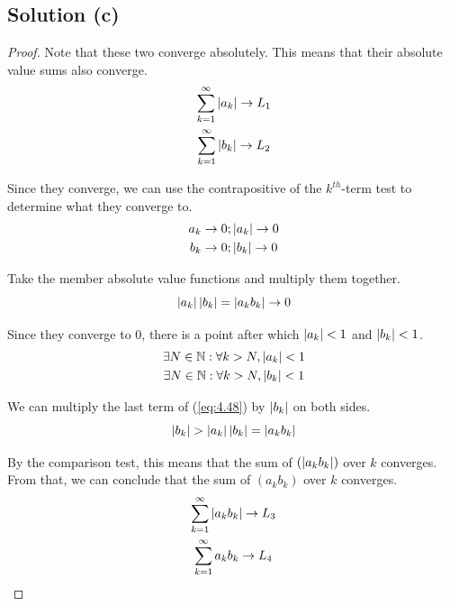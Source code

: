 \documentclass[12pt]{report}
\begin{document}
    \subsection{Solution (c)}
        \begin{proof}
            Note that these two converge absolutely.
            This means that their absolute value sums also converge.
            \begin{gather}
                \sum_{k = 1}^{\infty} \left| a_k \right| \to L_1\\
                \sum_{k = 1}^{\infty} \left| b_k \right| \to L_2
            \end{gather}

            Since they converge, we can use the contrapositive of the $k^{th}$-term test to determine what they converge to.
            \begin{gather}
                a_k \to 0; \left| a_k \right| \to 0\\
                b_k \to 0; \left| b_k \right| \to 0
            \end{gather}

            Take the member absolute value functions and multiply them together.
            \begin{equation}
                \left| a_k \right| \left| b_k \right| = \left| a_k b_k \right| \to 0
            \end{equation}

            Since they converge to 0, there is a point after which $\left| a_k \right| < 1$ and $\left| b_k \right| < 1$.
            \begin{gather} \label{eq:4.48}
                \exists N \in \mathbb{N} : \forall k > N, \left| a_k \right| < 1\\
                \exists N \in \mathbb{N} : \forall k > N, \left| b_k \right| < 1
            \end{gather}

            We can multiply the last term of (\ref{eq:4.48}) by $\left| b_k \right|$ on both sides.
            \begin{equation}
                \left| b_k \right| > \left| a_k \right| \left| b_k \right| = \left| a_k b_k \right|
            \end{equation}

            By the comparison test, this means that the sum of $(\left| a_k b_k \right|)$ over $k$ converges.
            From that, we can conclude that the sum of $(a_k b_k)$ over $k$ converges.
            \begin{gather}
                \sum_{k = 1}^{\infty} \left| a_k b_k \right| \to L_3\\
                \sum_{k = 1}^{\infty} a_k b_k \to L_4
            \end{gather}
        \end{proof}
    \pagebreak
\end{document}
